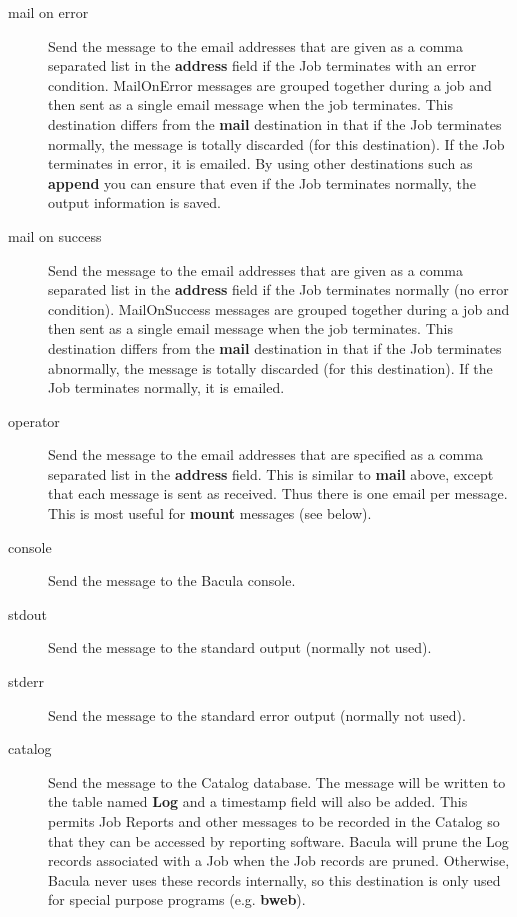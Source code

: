 \begin{description}
\begin{description}
\item [mail on error]
   Send the message to the email addresses that are given as a comma
   separated list in the {\bf address} field if the Job terminates with an
   error condition.  MailOnError messages are grouped together during a job
   and then sent as a single email message when the job terminates.  This
   destination differs from the {\bf mail} destination in that if the Job
   terminates normally, the message is totally discarded (for this
   destination).  If the Job terminates in error, it is emailed.  By using
   other destinations such as {\bf append} you can ensure that even if the
   Job terminates normally, the output information is saved.

\item [mail on success]
   Send the message to the email addresses that are given as a comma
   separated list in the {\bf address} field if the Job terminates
   normally (no error condition).  MailOnSuccess messages are grouped
   together during a job and then sent as a single email message when the
   job terminates.  This destination differs from the {\bf mail}
   destination in that if the Job terminates abnormally, the message is
   totally discarded (for this destination).  If the Job terminates
   normally, it is emailed.

\item [operator]
   Send the message to the email addresses that are specified as a comma
   separated list in the {\bf address} field.  This is similar to {\bf
   mail} above, except that each message is sent as received.  Thus there
   is one email per message.  This is most useful for {\bf mount} messages
   (see below).  

\item [console]
  Send the message to the Bacula console.

\item [stdout]
  Send the message to the standard output (normally not used).

\item [stderr]
  Send the message to the standard error output (normally not used).

\item [catalog]
   Send the message to the Catalog database. The message will be
   written to the table named {\bf Log} and a timestamp field will
   also be added. This permits Job Reports and other messages to
   be recorded in the Catalog so that they can be accessed by
   reporting software.  Bacula will prune the Log records associated
   with a Job when the Job records are pruned.  Otherwise, Bacula 
   never uses these records internally, so this destination is only
   used for special purpose programs (e.g. {\bf bweb}).


\end{description}
\end{description}
